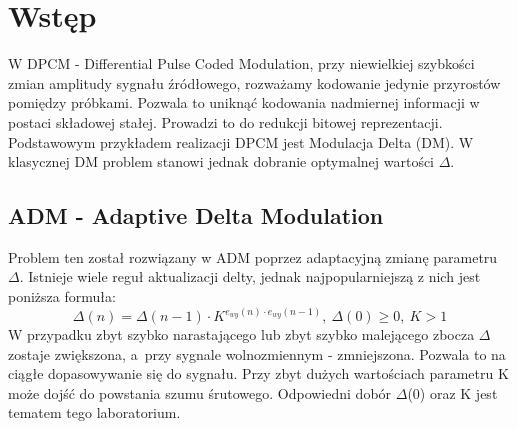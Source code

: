 \documentclass[12pt, a4paper, oneside]{article}
\begin{document}
\section{Wstęp}
W DPCM - Differential Pulse Coded Modulation, przy niewielkiej szybkości zmian amplitudy sygnału źródłowego, rozważamy kodowanie jedynie przyrostów pomiędzy próbkami. Pozwala to uniknąć kodowania nadmiernej informacji w postaci składowej stałej. Prowadzi to do redukcji bitowej reprezentacji. Podstawowym przykładem realizacji DPCM jest Modulacja Delta (DM). W klasycznej DM problem stanowi jednak dobranie optymalnej wartości $\Delta$.
\subsection{ADM - Adaptive Delta Modulation}
Problem ten został rozwiązany w ADM poprzez adaptacyjną zmianę parametru $\Delta$. Istnieje wiele reguł aktualizacji delty, jednak najpopularniejszą z nich jest poniższa formuła:
\begin{equation}
\Delta(n)=\Delta(n-1)\cdot K^{e_{wy}(n)\cdot e_{wy}(n-1)},~\Delta(0)\geq0,~K>1
\end{equation}
W przypadku zbyt szybko narastającego lub zbyt szybko malejącego zbocza $\Delta$ zostaje zwiększona, a~przy sygnale wolnozmiennym - zmniejszona. Pozwala to na ciągłe dopasowywanie się do sygnału. Przy zbyt dużych wartościach parametru K może dojść do powstania szumu śrutowego. Odpowiedni dobór $\Delta$(0) oraz K jest tematem tego laboratorium.
\end{document}
